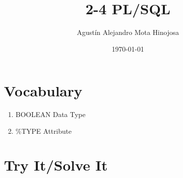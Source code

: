 \documentclass[11pt]{article}
\author{Agustín Alejandro Mota Hinojosa}
\date{\today}
\title{2-4 PL/SQL}
\begin{document}
\maketitle
\tableofcontents

\section{Vocabulary}
\label{sec:orgf3b6d0e}
\begin{enumerate}
\item BOOLEAN Data Type
\item \%TYPE Attribute
\end{enumerate}
\section{Try It/Solve It}
\label{sec:org9111cbc}
\end{document}
